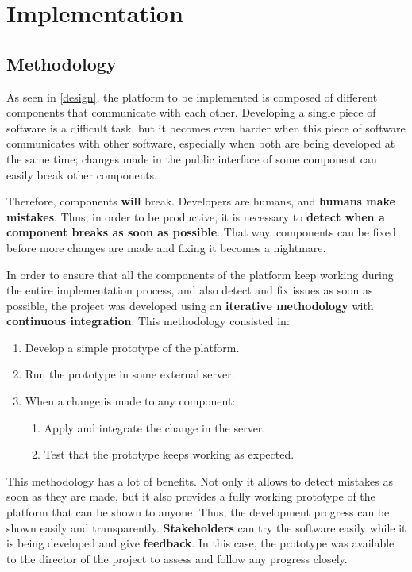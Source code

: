 \documentclass[a4paper,11pt,titlepage,abstract,numbers=noenddot,automark,mnsy,intlimits,rgb,dvipsnames]{report}
\begin{document}
\part{Implementation}
\chapter{Methodology}
\label{methodology}
As seen in \autoref{design}, the platform to be implemented is composed of different components that communicate with
each other. Developing a single piece of software is a difficult task, but it becomes even harder when this piece of software
communicates with other software, especially when both are being developed at the same time; changes made in
the public interface of some component can easily break other components.

Therefore, components \textbf{will} break. Developers are humans, and \textbf{humans make mistakes}. Thus, in order to be productive,
it is necessary to \textbf{detect when a component breaks as soon as possible}. That way, components can be fixed before more changes
are made and fixing it becomes a nightmare.

In order to ensure that all the components of the platform keep working during the entire implementation process, and also
detect and fix issues as soon as possible, the project was developed using an \textbf{iterative methodology} with
\textbf{continuous integration}. This methodology consisted in:
\begin{enumerate}
\item
Develop a simple prototype of the platform.
\item
Run the prototype in some external server.
\item
When a change is made to any component:
\begin{enumerate}
\item
Apply and integrate the change in the server.
\item
Test that the prototype keeps working as expected.
\end{enumerate}
\end{enumerate}
This methodology has a lot of benefits. Not only it allows to detect mistakes as soon as they are made, but it also provides
a fully working prototype of the platform that can be shown to anyone. Thus, the development progress can be shown easily and
transparently. \textbf{Stakeholders} can try the software easily while it is being developed and give \textbf{feedback}. In this case,
the prototype was available to the director of the project to assess and follow any progress closely.
\end{document}
